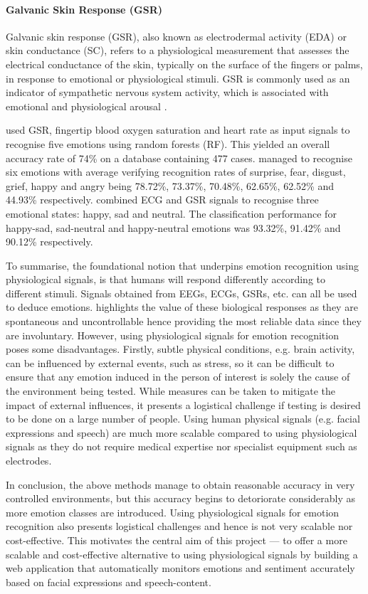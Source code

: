 \documentclass[12pt, a4paper]{article}
\newcommand{\np}
    {
    \vskip 0.4cm
    }
\begin{document}
\paragraph{Galvanic Skin Response (GSR)}

Galvanic skin response (GSR), also known as electrodermal activity (EDA) or skin conductance (SC), refers to a physiological measurement that assesses the electrical conductance of the skin, typically on the surface of the fingers or palms, in response to emotional or physiological stimuli. GSR is commonly used as an indicator of sympathetic nervous system activity, which is associated with emotional and physiological arousal \citep{wu2010analysis, lidberg1981sympathetic}.
\np
\cite{wen2014emotion} used GSR, fingertip blood oxygen saturation and heart rate as input signals to recognise five emotions using random forests (RF). This yielded an overall accuracy rate of 74\% on a database containing 477 cases. \cite{wu2010analysis} managed to recognise six emotions with average verifying recognition rates of surprise, fear, disgust, grief, happy and angry being 78.72\%, 73.37\%, 70.48\%, 62.65\%, 62.52\% and 44.93\% respectively. \cite{das2016emotion} combined ECG and GSR signals to recognise three emotional states: happy, sad and neutral. The classification performance for happy-sad, sad-neutral and happy-neutral emotions was 93.32\%, 91.42\% and 90.12\% respectively.
\np
To summarise, the foundational notion that underpins emotion recognition using physiological signals, is that humans will respond differently according to different stimuli. Signals obtained from EEGs, ECGs, GSRs, etc. can all be used to deduce emotions. \cite{physiosignals} highlights the value of these biological responses as they are spontaneous and uncontrollable hence providing the most reliable data since they are involuntary. However, using physiological signals for emotion recognition poses some disadvantages. Firstly, subtle physical conditions, e.g. brain activity, can be influenced by external events, such as stress, so it can be difficult to ensure that any emotion induced in the person of interest is solely the cause of the environment being tested. While measures can be taken to mitigate the impact of external influences, it presents a logistical challenge if testing is desired to be done on a large number of people. Using human physical signals (e.g. facial expressions and speech) are much more scalable compared to  using physiological signals as they do not require medical expertise nor specialist equipment such as electrodes.
\np
In conclusion, the above methods manage to obtain reasonable accuracy in very controlled environments, but this accuracy begins to detoriorate considerably as more emotion classes are introduced. Using physiological signals for emotion recognition also presents logistical challenges and hence is not very scalable nor cost-effective. This motivates the central aim of this project --- to offer a more scalable and cost-effective alternative to using physiological signals by building a web application that automatically monitors emotions and sentiment accurately based on facial expressions and speech-content.
\end{document}
